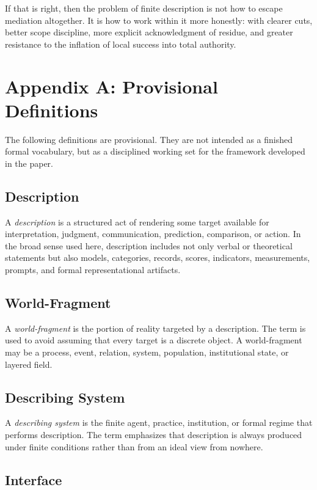 \documentclass[11pt]{article}
\renewcommand{\emph}[1]{\textit{#1}}
\begin{document}
If that is right, then the problem of finite description is not how to escape mediation altogether. It is how to work within it more honestly: with clearer cuts, better scope discipline, more explicit acknowledgment of residue, and greater resistance to the inflation of local success into total authority.

\appendix
\section*{Appendix A: Provisional Definitions}

The following definitions are provisional. They are not intended as a finished formal vocabulary, but as a disciplined working set for the framework developed in the paper.

\subsection*{Description}

A \emph{description} is a structured act of rendering some target available for interpretation, judgment, communication, prediction, comparison, or action. In the broad sense used here, description includes not only verbal or theoretical statements but also models, categories, records, scores, indicators, measurements, prompts, and formal representational artifacts.

\subsection*{World-Fragment}

A \emph{world-fragment} is the portion of reality targeted by a description. The term is used to avoid assuming that every target is a discrete object. A world-fragment may be a process, event, relation, system, population, institutional state, or layered field.

\subsection*{Describing System}

A \emph{describing system} is the finite agent, practice, institution, or formal regime that performs description. The term emphasizes that description is always produced under finite conditions rather than from an ideal view from nowhere.

\subsection*{Interface}
\end{document}
